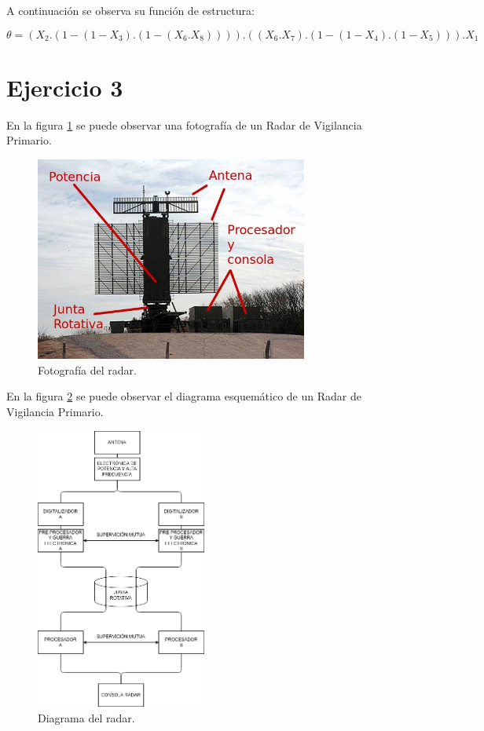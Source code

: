 \documentclass[
    11pt,
    spanish,
    a4paper
]{article}
\begin{document}
A continuación se observa su función de estructura:

\begin{dmath}
	\theta = (X_2 . (1 - (1-X_3).(1-(X_6.X_8)))) . ((X_6 . X_7) . (1-(1-X_4).(1-X_5))) . X_1
\end{dmath}

\newpage

\section{Ejercicio 3}

En la figura \ref{fig:fotoradar} se puede observar una fotografía de un Radar de Vigilancia Primario.

\begin{figure}[htbp]
	\centering
	\includegraphics[width=0.8\textwidth]{img/radares.jpg}
	\caption{Fotografía del radar.}
	\label{fig:fotoradar}
\end{figure}

En la figura \ref{fig:radar} se puede observar el diagrama esquemático de un Radar de Vigilancia Primario.

\begin{figure}[htbp]
	\centering
	\includegraphics[width=0.5\textwidth]{img/radar.png}
	\caption{Diagrama del radar.}
	\label{fig:radar}
\end{figure}
\end{document}
